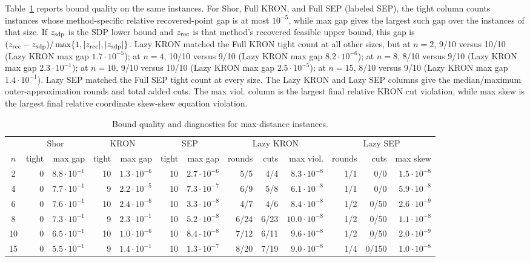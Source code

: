 \documentclass[11pt]{article}
\begin{document}
Table~\ref{tab:maxdist_diagnostics} reports bound quality on the same instances.
For Shor, Full KRON, and Full SEP (labeled SEP), the tight column counts instances whose
method-specific relative recovered-point gap is at most \(10^{-5}\), while max
gap gives the largest such gap over the instances of that size.  If
\(z_{\rm sdp}\) is the SDP lower bound and \(z_{\rm rec}\) is that method's
recovered feasible upper bound, this gap is
\((z_{\rm rec}-z_{\rm sdp})/
\max\{1,|z_{\rm rec}|,|z_{\rm sdp}|\}\).  Lazy KRON matched the Full KRON tight count at all other sizes, but at \(n=2\), 9/10 versus 10/10 (Lazy KRON max gap $1.7\cdot 10^{-5}$); at \(n=4\), 10/10 versus 9/10 (Lazy KRON max gap $8.2\cdot 10^{-6}$); at \(n=8\), 8/10 versus 9/10 (Lazy KRON max gap $2.3\cdot 10^{-1}$); at \(n=10\), 9/10 versus 10/10 (Lazy KRON max gap $2.5\cdot 10^{-5}$); at \(n=15\), 8/10 versus 9/10 (Lazy KRON max gap $1.4\cdot 10^{-1}$).  Lazy SEP matched the Full SEP tight count at every size.  The Lazy KRON and Lazy SEP columns give the
median/maximum outer-approximation rounds and total added cuts.  The max viol.
column is the largest final relative KRON cut violation, while max skew is the
largest final relative coordinate skew-skew equation violation.

\begin{table}[htbp]
\centering
\caption{Bound quality and diagnostics for max-distance instances.}
\label{tab:maxdist_diagnostics}
\begingroup
\setlength{\tabcolsep}{1.6pt}
\tiny
\begin{tabular}{c|r r|r r|r r|r r r|r r r}
\hline
& \multicolumn{2}{c|}{Shor} & \multicolumn{2}{c|}{KRON} & \multicolumn{2}{c|}{SEP} & \multicolumn{3}{c|}{Lazy KRON} & \multicolumn{3}{c}{Lazy SEP} \\
$n$ & tight & max gap & tight & max gap & tight & max gap & rounds & cuts & max viol. & rounds & cuts & max skew \\
\hline
2 & 0 & $8.8\cdot 10^{-1}$ & 10 & $1.3\cdot 10^{-6}$ & 10 & $2.7\cdot 10^{-6}$ & 5/5 & 4/4 & $8.3\cdot 10^{-8}$ & 1/1 & 0/0 & $1.5\cdot 10^{-8}$ \\
4 & 0 & $7.7\cdot 10^{-1}$ & 9 & $2.2\cdot 10^{-5}$ & 10 & $7.3\cdot 10^{-7}$ & 6/9 & 5/8 & $6.1\cdot 10^{-8}$ & 1/1 & 0/0 & $5.9\cdot 10^{-8}$ \\
6 & 0 & $7.6\cdot 10^{-1}$ & 10 & $2.4\cdot 10^{-6}$ & 10 & $3.3\cdot 10^{-8}$ & 4/7 & 4/6 & $8.4\cdot 10^{-8}$ & 1/2 & 0/50 & $2.6\cdot 10^{-9}$ \\
8 & 0 & $7.3\cdot 10^{-1}$ & 9 & $2.3\cdot 10^{-1}$ & 10 & $5.2\cdot 10^{-8}$ & 6/24 & 6/23 & $10.0\cdot 10^{-8}$ & 1/2 & 0/50 & $1.1\cdot 10^{-8}$ \\
10 & 0 & $6.5\cdot 10^{-1}$ & 10 & $1.0\cdot 10^{-6}$ & 10 & $8.4\cdot 10^{-8}$ & 7/12 & 6/11 & $9.6\cdot 10^{-8}$ & 1/2 & 0/50 & $2.0\cdot 10^{-9}$ \\
15 & 0 & $5.5\cdot 10^{-1}$ & 9 & $1.4\cdot 10^{-1}$ & 10 & $1.3\cdot 10^{-7}$ & 8/20 & 7/19 & $9.0\cdot 10^{-8}$ & 1/4 & 0/150 & $1.0\cdot 10^{-8}$ \\
\hline
\hline
\end{tabular}
\endgroup
\end{table}
\end{document}
